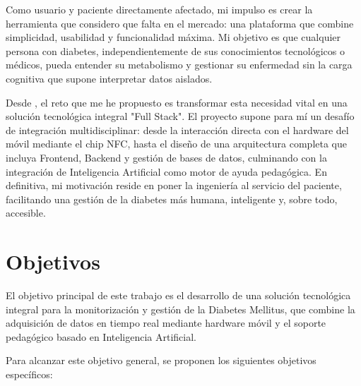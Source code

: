 Como usuario y paciente directamente afectado, mi impulso es crear la herramienta que considero que falta en el mercado: una plataforma que combine simplicidad, usabilidad y funcionalidad máxima. Mi objetivo es que cualquier persona con diabetes, independientemente de sus conocimientos tecnológicos o médicos, pueda entender su metabolismo y gestionar su enfermedad sin la carga cognitiva que supone interpretar datos aislados.

Desde , el reto que me he propuesto es transformar esta necesidad vital en una solución tecnológica integral "Full Stack". El proyecto supone para mí un desafío de integración multidisciplinar: desde la interacción directa con el hardware del móvil mediante el chip NFC, hasta el diseño de una arquitectura completa que incluya Frontend, Backend y gestión de bases de datos, culminando con la integración de Inteligencia Artificial como motor de ayuda pedagógica. En definitiva, mi motivación reside en poner la ingeniería al servicio del paciente, facilitando una gestión de la diabetes más humana, inteligente y, sobre todo, accesible.

\section{Objetivos}
El objetivo principal de este trabajo es el desarrollo de una solución tecnológica integral para la monitorización y gestión de la Diabetes Mellitus, que combine la adquisición de datos en tiempo real mediante hardware móvil y el soporte pedagógico basado en Inteligencia Artificial.

Para alcanzar este objetivo general, se proponen los siguientes objetivos específicos:

